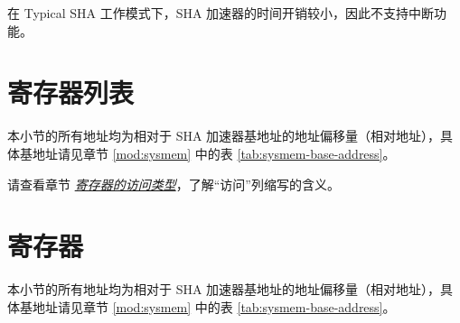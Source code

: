 \documentclass[main\_\_CN.tex]{subfiles}
\begin{document}
在 Typical SHA 工作模式下，SHA 加速器的时间开销较小，因此不支持中断功能。

\clearpage
\hypertarget{sha-reg-summ}{}
\section{寄存器列表} \label{sec:sha-reg-summ} 

本小节的所有地址均为相对于 SHA 加速器基地址的地址偏移量（相对地址），具体基地址请见章节 \ref{mod:sysmem} \textit{} 中的表 \ref{tab:sysmem-base-address}。

请查看章节 \hyperref[glossary-access-types]{\textit{寄存器的访问类型}}，了解“访问”列缩写的含义。



\section{寄存器}

本小节的所有地址均为相对于 SHA 加速器基地址的地址偏移量（相对地址），具体基地址请见章节 \ref{mod:sysmem} \textit{} 中的表 \ref{tab:sysmem-base-address}。


\end{document}
